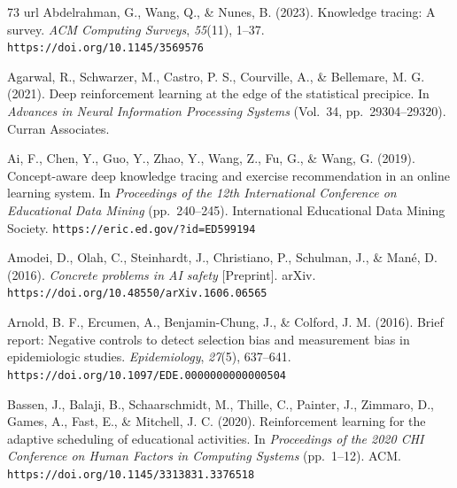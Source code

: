 \documentclass[a4paper,preprint,12pt,authoryear]{elsarticle}
\begin{document}
\begin{thebibliography}{73}
\expandafter\ifx\csname url\endcsname\relax
  \def\url#1{\texttt{#1}}\fi
{}
Abdelrahman, G., Wang, Q., \& Nunes, B. (2023). Knowledge tracing: A survey. \textit{ACM Computing Surveys}, \textit{55}(11), 1--37. \url{https://doi.org/10.1145/3569576}

Agarwal, R., Schwarzer, M., Castro, P. S., Courville, A., \& Bellemare, M. G. (2021). Deep reinforcement learning at the edge of the statistical precipice. In \textit{Advances in Neural Information Processing Systems} (Vol.~34, pp.~29304--29320). Curran Associates.

Ai, F., Chen, Y., Guo, Y., Zhao, Y., Wang, Z., Fu, G., \& Wang, G. (2019). Concept-aware deep knowledge tracing and exercise recommendation in an online learning system. In \textit{Proceedings of the 12th International Conference on Educational Data Mining} (pp.~240--245). International Educational Data Mining Society. \url{https://eric.ed.gov/?id=ED599194}

Amodei, D., Olah, C., Steinhardt, J., Christiano, P., Schulman, J., \& Mané, D. (2016). \textit{Concrete problems in AI safety} [Preprint]. arXiv. \url{https://doi.org/10.48550/arXiv.1606.06565}

Arnold, B. F., Ercumen, A., Benjamin-Chung, J., \& Colford, J. M. (2016). Brief report: Negative controls to detect selection bias and measurement bias in epidemiologic studies. \textit{Epidemiology}, \textit{27}(5), 637--641. \url{https://doi.org/10.1097/EDE.0000000000000504}

Bassen, J., Balaji, B., Schaarschmidt, M., Thille, C., Painter, J., Zimmaro, D., Games, A., Fast, E., \& Mitchell, J. C. (2020). Reinforcement learning for the adaptive scheduling of educational activities. In \textit{Proceedings of the 2020 CHI Conference on Human Factors in Computing Systems} (pp.~1--12). ACM. \url{https://doi.org/10.1145/3313831.3376518}


\end{thebibliography}
\end{document}
